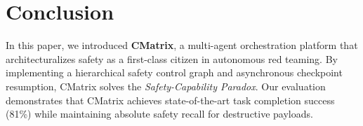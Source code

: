 \documentclass[conference]{IEEEtran}
\begin{document}
\section{Conclusion}
\label{sec:conclusion}

In this paper, we introduced \textbf{CMatrix}, a multi-agent orchestration platform that architecturalizes safety as a first-class citizen in autonomous red teaming. By implementing a hierarchical safety control graph and asynchronous checkpoint resumption, CMatrix solves the \textit{Safety-Capability Paradox}. Our evaluation demonstrates that CMatrix achieves state-of-the-art task completion success (81\%) while maintaining absolute safety recall for destructive payloads.



\end{document}
